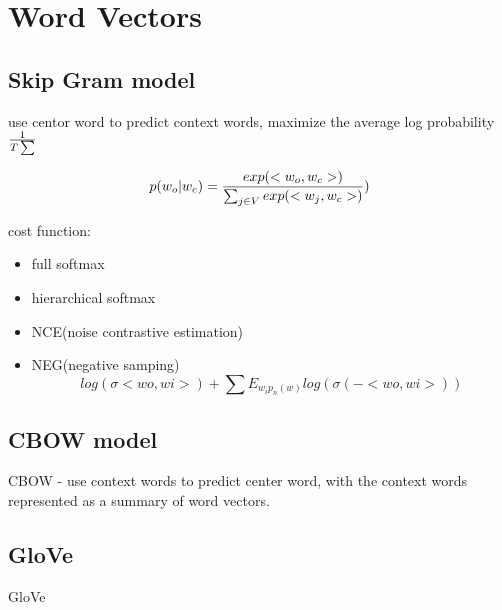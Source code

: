 \documentclass[10pt,a4paper]{book}
\begin{document}
\section{Word Vectors}

\subsection{Skip Gram model}
use centor word to predict context words, maximize the average log probability
$1\over T \sum$

$$ p(w_o | w_c) = {exp(<w_o,w_c>) \over \sum_{j \in V} exp(<w_j,w_c>) })$$

cost function:
\begin{itemize}
	\item full softmax
	\item hierarchical softmax
	\item NCE(noise contrastive estimation)
	\item NEG(negative samping)
	$$log(\sigma <wo,wi>) + \sum E_{w_i  p_n(w)} {log(\sigma (- <wo,wi>))}$$
\end{itemize}


\subsection{CBOW model}

CBOW - use context words to predict center word, with the context words represented as a summary of word vectors.

\subsection{GloVe}
GloVe
\end{document}
